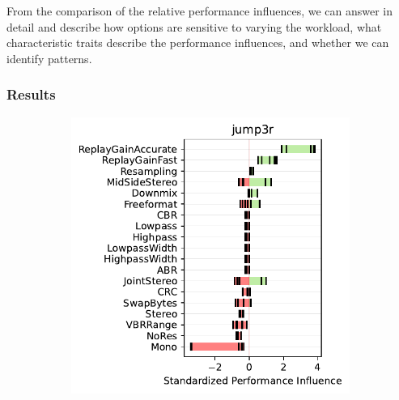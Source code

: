 {{{From the comparison of the relative performance influences, we can answer  in detail and describe how options are sensitive to varying the workload, what characteristic traits describe the performance influences, and whether we can identify patterns.

\subsubsection{Results}\label{sec:results2}

\begin{figure}
	
	\begin{subfigure}{0.3\linewidth}
		\centering
		\includegraphics[width=\linewidth]{images/jump3r.pdf}
		\caption{\jumper}
		\label{fig:overview_jump3r}
	\end{subfigure}
	\begin{subfigure}{0.3\linewidth}
		\centering

\end{subfigure}
\end{figure}}}}
